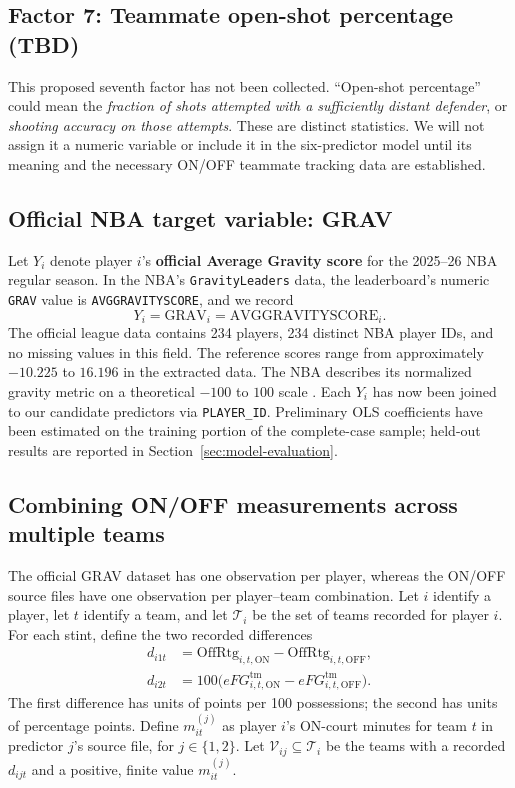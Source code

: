 \documentclass[11pt]{article}
\begin{document}
\subsection{Factor 7: Teammate open-shot percentage (TBD)}
This proposed seventh factor has not been collected. ``Open-shot
percentage'' could mean the \emph{fraction of shots attempted with a
sufficiently distant defender}, or \emph{shooting accuracy on those
attempts}. These are distinct statistics. We will not assign it a
numeric variable or include it in the six-predictor model until its
meaning and the necessary ON/OFF teammate tracking data are established.

\subsection{Official NBA target variable: GRAV}
Let $Y_i$ denote player $i$'s \textbf{official Average Gravity score}
for the 2025--26 NBA regular season. In the NBA's
\texttt{GravityLeaders} data, the leaderboard's numeric \texttt{GRAV}
value is \texttt{AVGGRAVITYSCORE}, and we record
\begin{equation}
 \boxed{Y_i=\mathrm{GRAV}_i=\mathrm{AVGGRAVITYSCORE}_i.}
 \label{eq:grav-target}
\end{equation}
The official league data contains 234 players, 234 distinct NBA player
IDs, and no missing values in this field. The reference scores range
from approximately $-10.225$ to $16.196$ in the extracted data. The
NBA describes its normalized gravity metric on a theoretical $-100$ to
$100$ scale \cite{nba-gravity-intro,nba-gravity-board,nba-gravity-api}.
Each $Y_i$ has now been joined to our candidate predictors via
\texttt{PLAYER\_ID}. Preliminary OLS coefficients have been estimated on
the training portion of the complete-case sample; held-out results are
reported in Section~\ref{sec:model-evaluation}.


\subsection{Combining ON/OFF measurements across multiple teams}
The official GRAV dataset has one observation per player, whereas the
ON/OFF source files have one observation per player--team combination.
Let $i$ identify a player, let $t$ identify a team, and let
$\mathcal{T}_i$ be the set of teams recorded for player $i$.
For each stint, define the two recorded differences
\begin{align}
 d_{i1t}&=\mathrm{OffRtg}_{i,t,\mathrm{ON}}
           -\mathrm{OffRtg}_{i,t,\mathrm{OFF}},\label{eq:stint-off}\\
 d_{i2t}&=100\bigl(eFG^{\mathrm{tm}}_{i,t,\mathrm{ON}}
           -eFG^{\mathrm{tm}}_{i,t,\mathrm{OFF}}\bigr).
           \label{eq:stint-efg}
\end{align}
The first difference has units of points per 100 possessions; the second
has units of percentage points. Define $m_{it}^{(j)}$ as player $i$'s
ON-court minutes for team $t$ in predictor $j$'s source file, for
$j\in\{1,2\}$. Let $\mathcal{V}_{ij}\subseteq\mathcal{T}_i$
be the teams with a recorded $d_{ijt}$ and a positive, finite value
$m_{it}^{(j)}$.
\end{document}
